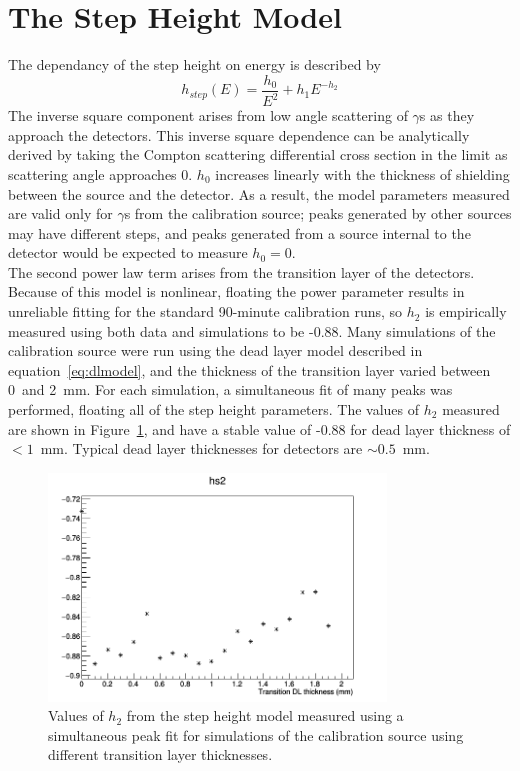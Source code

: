 \documentclass[/main.tex]{subfiles}
\begin{document}
\section{The Step Height Model} \label{sec:stepheight}
The dependancy of the step height on energy is described by
\begin{equation}
  h_{step}(E) = \frac{h_0}{E^2} + h_1E^{-h_2}
\end{equation}
The inverse square component arises from low angle scattering of $\gamma$s as they approach the detectors.
This inverse square dependence can be analytically derived by taking the Compton scattering differential cross section in the limit as scattering angle approaches 0\cite{2011Oberer}.
$h_0$ increases linearly with the thickness of shielding between the source and the detector.
As a result, the model parameters measured are valid only for $\gamma$s from the calibration source; peaks generated by other sources may have different steps, and peaks generated from a source internal to the detector would be expected to measure $h_0=0$.
\\
The second power law term arises from the transition layer of the detectors.
Because of this model is nonlinear, floating the power parameter results in unreliable fitting for the standard 90-minute calibration runs, so $h_2$ is empirically measured using both data and simulations to be -0.88.
Many simulations of the  calibration source were run using the dead layer model described in equation~\ref{eq:dlmodel}, and the thickness of the transition layer varied between 0~and 2~mm.
For each simulation, a simultaneous fit of many peaks was performed, floating all of the step height parameters.
The values of $h_2$ measured are shown in Figure~\ref{fig:stepheightpars_sim}, and have a stable value of -0.88 for dead layer thickness of $<1$~mm.
Typical dead layer thicknesses for detectors are ${\sim}0.5$~mm.
\begin{figure}[t]
  \centering
  \includegraphics[width=0.8\textwidth]{hs2_tl}
  \caption[Simulated dependance of $h_2$ on transition layer thickness] {\label{fig:stepheightpars_sim}
    Values of $h_2$ from the step height model measured using a simultaneous peak fit for simulations of the  calibration source using different transition layer thicknesses.
  }
\end{figure}
\end{document}
